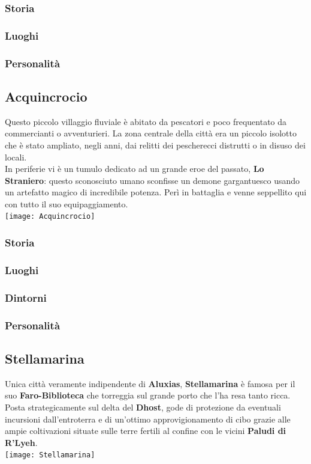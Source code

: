 \documentclass[10pt,twoside,onecolumn,openany]{book}
\begin{document}
\subsubsection{Storia}
\subsubsection{Luoghi}
\subsubsection{Personalità}
\newpage
\subsection{Acquincrocio}
Questo piccolo villaggio fluviale è abitato da pescatori e poco frequentato da commercianti o avventurieri. La zona centrale della città era un piccolo isolotto che è stato ampliato, negli anni, dai relitti dei pescherecci distrutti o in disuso dei locali.\\
In periferie vi è un tumulo dedicato ad un grande eroe del passato, \textbf{Lo Straniero}: questo sconosciuto umano sconfisse un demone gargantuesco usando un artefatto magico di incredibile potenza. Perì in battaglia e venne seppellito qui con tutto il suo equipaggiamento.\\
\texttt{[image: Acquincrocio]}
\subsubsection{Storia}
\subsubsection{Luoghi}
\subsubsection{Dintorni}
\subsubsection{Personalità}
\newpage
\subsection{Stellamarina}
Unica città veramente indipendente di \textbf{Aluxias}, \textbf{Stellamarina} è famosa per il suo \textbf{Faro-Biblioteca} che torreggia sul grande porto che l'ha resa tanto ricca.\\
Posta strategicamente sul delta del \textbf{Dhost}, gode di protezione da eventuali incursioni dall'entroterra e di un'ottimo approvigionamento di cibo grazie alle ampie coltivazioni situate sulle terre fertili al confine con le vicini \textbf{Paludi di R'Lyeh}.\\
\texttt{[image: Stellamarina]}
\end{document}
